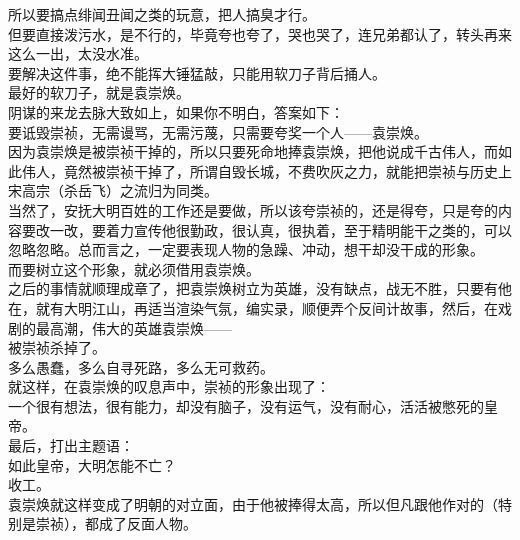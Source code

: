 \begin{multicols}{\theparacolNo}
所以要搞点绯闻丑闻之类的玩意，把人搞臭才行。\\

但要直接泼污水，是不行的，毕竟夸也夸了，哭也哭了，连兄弟都认了，转头再来这么一出，太没水准。\\

要解决这件事，绝不能挥大锤猛敲，只能用软刀子背后捅人。\\

最好的软刀子，就是袁崇焕。\\

阴谋的来龙去脉大致如上，如果你不明白，答案如下：\\

要诋毁崇祯，无需谩骂，无需污蔑，只需要夸奖一个人——袁崇焕。\\

因为袁崇焕是被崇祯干掉的，所以只要死命地捧袁崇焕，把他说成千古伟人，而如此伟人，竟然被崇祯干掉了，所谓自毁长城，不费吹灰之力，就能把崇祯与历史上宋高宗（杀岳飞）之流归为同类。\\

当然了，安抚大明百姓的工作还是要做，所以该夸崇祯的，还是得夸，只是夸的内容要改一改，要着力宣传他很勤政，很认真，很执着，至于精明能干之类的，可以忽略忽略。总而言之，一定要表现人物的急躁、冲动，想干却没干成的形象。\\

而要树立这个形象，就必须借用袁崇焕。\\

之后的事情就顺理成章了，把袁崇焕树立为英雄，没有缺点，战无不胜，只要有他在，就有大明江山，再适当渲染气氛，编实录，顺便弄个反间计故事，然后，在戏剧的最高潮，伟大的英雄袁崇焕——\\

被崇祯杀掉了。\\

多么愚蠢，多么自寻死路，多么无可救药。\\

就这样，在袁崇焕的叹息声中，崇祯的形象出现了：\\

一个很有想法，很有能力，却没有脑子，没有运气，没有耐心，活活被憋死的皇帝。\\

最后，打出主题语：\\

如此皇帝，大明怎能不亡？\\

收工。\\

袁崇焕就这样变成了明朝的对立面，由于他被捧得太高，所以但凡跟他作对的（特别是崇祯），都成了反面人物。\\


\end{multicols}

